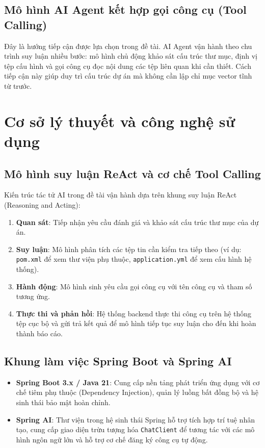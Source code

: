 \documentclass[12pt,a4paper]{report}
\begin{document}
\subsection{Mô hình AI Agent kết hợp gọi công cụ (Tool Calling)}
Đây là hướng tiếp cận được lựa chọn trong đề tài. AI Agent vận hành theo chu trình suy luận nhiều bước: mô hình chủ động khảo sát cấu trúc thư mục, định vị tệp cấu hình và gọi công cụ đọc nội dung các tệp liên quan khi cần thiết. Cách tiếp cận này giúp duy trì cấu trúc dự án mà không cần lập chỉ mục vector tĩnh từ trước.

\section{Cơ sở lý thuyết và công nghệ sử dụng}

\subsection{Mô hình suy luận ReAct và cơ chế Tool Calling}
Kiến trúc tác tử AI trong đề tài vận hành dựa trên khung suy luận ReAct (Reasoning and Acting):
\begin{enumerate}
    \item \textbf{Quan sát}: Tiếp nhận yêu cầu đánh giá và khảo sát cấu trúc thư mục của dự án.
    \item \textbf{Suy luận}: Mô hình phân tích các tệp tin cần kiểm tra tiếp theo (ví dụ: \texttt{pom.xml} để xem thư viện phụ thuộc, \texttt{application.yml} để xem cấu hình hệ thống).
    \item \textbf{Hành động}: Mô hình sinh yêu cầu gọi công cụ với tên công cụ và tham số tương ứng.
    \item \textbf{Thực thi và phản hồi}: Hệ thống backend thực thi công cụ trên hệ thống tệp cục bộ và gửi trả kết quả để mô hình tiếp tục suy luận cho đến khi hoàn thành báo cáo.
\end{enumerate}

\subsection{Khung làm việc Spring Boot và Spring AI}
\begin{itemize}
    \item \textbf{Spring Boot 3.x / Java 21}: Cung cấp nền tảng phát triển ứng dụng với cơ chế tiêm phụ thuộc (Dependency Injection), quản lý luồng bất đồng bộ và hệ sinh thái bảo mật hoàn chỉnh.
    \item \textbf{Spring AI}: Thư viện trong hệ sinh thái Spring hỗ trợ tích hợp trí tuệ nhân tạo, cung cấp giao diện trừu tượng hóa \texttt{ChatClient} để tương tác với các mô hình ngôn ngữ lớn và hỗ trợ cơ chế đăng ký công cụ tự động.
\end{itemize}
\end{document}
